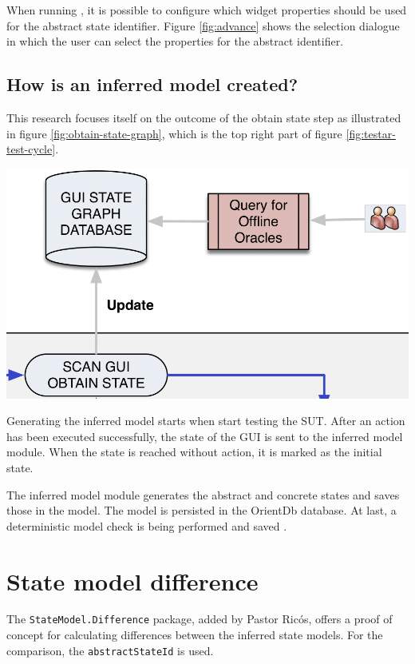 When running \testar, it is possible to configure which widget properties should be used for the abstract state identifier. Figure \ref{fig:advance} shows the selection dialogue in which the user can select the properties for the abstract identifier.

\subsection{How is an inferred model created?}
This research focuses itself on the outcome of the obtain state step as illustrated in figure \ref{fig:obtain-state-graph}, which is the top right part of figure \ref{fig:testar-test-cycle}.

\bigskip
\begingroup
\captionsetup{type=figure}
\includegraphics[scale=0.4]{images/obtain-state-graph.png}
\label{fig:obtain-state-graph}
\endgroup

Generating the inferred model starts when \testar start testing the SUT. After an action has been executed successfully, the state of the GUI is sent to the inferred model module. When the state is reached without action, it is marked as the initial state. 

The inferred model module generates the abstract and concrete states and saves those in the model. The model is persisted in the OrientDb database. At last, a deterministic model check is being performed and saved \cite{testar-code}.

\section{State model difference} \label{sec:state-model-difference}
The \verb|StateModel.Difference| package, added by Pastor Ricós\cite{stateDiff}, offers a proof of concept for calculating differences between the inferred state models. For the comparison, the \verb|abstractStateId| is used. 

